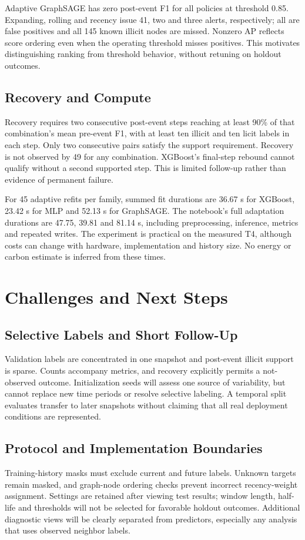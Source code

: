 \documentclass[10pt,twocolumn,letterpaper]{article}
\begin{document}
Adaptive GraphSAGE has zero post-event F1 for all policies at threshold 0.85. Expanding, rolling and recency issue 41, two and three alerts, respectively; all are false positives and all 145 known illicit nodes are missed. Nonzero AP reflects score ordering even when the operating threshold misses positives. This motivates distinguishing ranking from threshold behavior, without retuning on holdout outcomes.

\subsection{Recovery and Compute}
Recovery requires two consecutive post-event steps reaching at least 90\% of that combination's mean pre-event F1, with at least ten illicit and ten licit labels in each step. Only two consecutive pairs satisfy the support requirement. Recovery is not observed by 49 for any combination. XGBoost's final-step rebound cannot qualify without a second supported step. This is limited follow-up rather than evidence of permanent failure.

For 45 adaptive refits per family, summed fit durations are 36.67 s for XGBoost, 23.42 s for MLP and 52.13 s for GraphSAGE. The notebook's full adaptation durations are 47.75, 39.81 and 81.14 s, including preprocessing, inference, metrics and repeated writes. The experiment is practical on the measured T4, although costs can change with hardware, implementation and history size. No energy or carbon estimate is inferred from these times.

\section{Challenges and Next Steps}
\subsection{Selective Labels and Short Follow-Up}
Validation labels are concentrated in one snapshot and post-event illicit support is sparse. Counts accompany metrics, and recovery explicitly permits a not-observed outcome. Initialization seeds will assess one source of variability, but cannot replace new time periods or resolve selective labeling. A temporal split evaluates transfer to later snapshots without claiming that all real deployment conditions are represented.

\subsection{Protocol and Implementation Boundaries}
Training-history masks must exclude current and future labels. Unknown targets remain masked, and graph-node ordering checks prevent incorrect recency-weight assignment. Settings are retained after viewing test results; window length, half-life and thresholds will not be selected for favorable holdout outcomes. Additional diagnostic views will be clearly separated from predictors, especially any analysis that uses observed neighbor labels.
\end{document}
